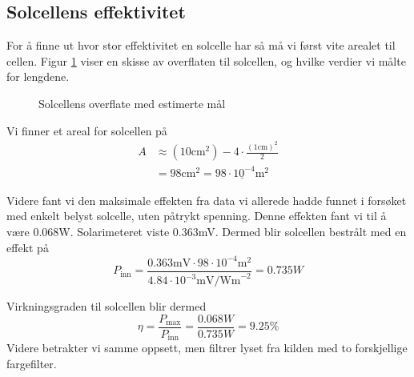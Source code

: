 \documentclass[a4paper,11pt, twocolumn]{article}
\begin{document}
\subsection{Solcellens effektivitet}
For å finne ut hvor stor effektivitet en solcelle har så må vi først vite arealet til cellen. Figur \ref{fig:solcelleoverflate} viser en skisse av overflaten til solcellen, og hvilke verdier vi målte for lengdene.
\begin{figure}[!ht]
\centering
	\caption{Solcellens overflate med estimerte mål}
	\label{fig:solcelleoverflate}
\end{figure}
Vi finner et areal for solcellen på
\begin{align}
	A &\approx (10\text{cm}^2)-4\cdot\frac{(1\text{cm})^2}{2}\\
	&= 98\text{cm}^2 = \underline{98\cdot 10^{-4}\text{m}^2}
\end{align}

Videre fant vi den maksimale effekten fra data vi allerede hadde funnet i forsøket med enkelt belyst solcelle, uten påtrykt spenning. Denne effekten fant vi til å være 0.068W. Solarimeteret viste 0.363mV. Dermed blir solcellen bestrålt med en effekt på
\begin{equation}
	P_\text{inn} = \frac{0.363\text{mV}\cdot98\cdot10^{-4}\text{m}^2}{4.84\cdot10^{-3}\text{mV/Wm}^{-2}} = 0.735W
\end{equation}

Virkningsgraden til solcellen blir dermed
\begin{equation}
	\eta = \frac{P_\text{max}}{P_\text{inn}} = \frac{0.068W}{0.735W} = 9.25\text{\%}
\end{equation}
Videre betrakter vi samme oppsett, men filtrer lyset fra kilden med to forskjellige fargefilter.
\end{document}
